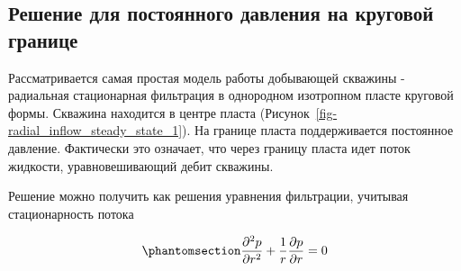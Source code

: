 \documentclass[
  russian,
  letterpaper,
  DIV=11,
  numbers=noendperiod,
  oneside]{scrartcl}
\begin{document}
\subsection{Решение для постоянного давления на круговой
границе}\label{ux440ux435ux448ux435ux43dux438ux435-ux434ux43bux44f-ux43fux43eux441ux442ux43eux44fux43dux43dux43eux433ux43e-ux434ux430ux432ux43bux435ux43dux438ux44f-ux43dux430-ux43aux440ux443ux433ux43eux432ux43eux439-ux433ux440ux430ux43dux438ux446ux435}

Рассматривается самая простая модель работы добывающей скважины -
радиальная стационарная фильтрация в однородном изотропном пласте
круговой формы. Скважина находится в центре пласта
(Рисунок~\ref{fig-radial_inflow_steady_state_1}). На границе пласта
поддерживается постоянное давление. Фактически это означает, что через
границу пласта идет поток жидкости, уравновешивающий дебит скважины.

Решение можно получить как решения уравнения фильтрации, учитывая
стационарность потока

\begin{equation}\phantomsection\label{eq-diff_eq_10}{  
    \frac{\partial ^2 p }{\partial r^2} + \frac{1}{r} \frac{\partial p}{\partial r} = 0
}\end{equation}
\end{document}
